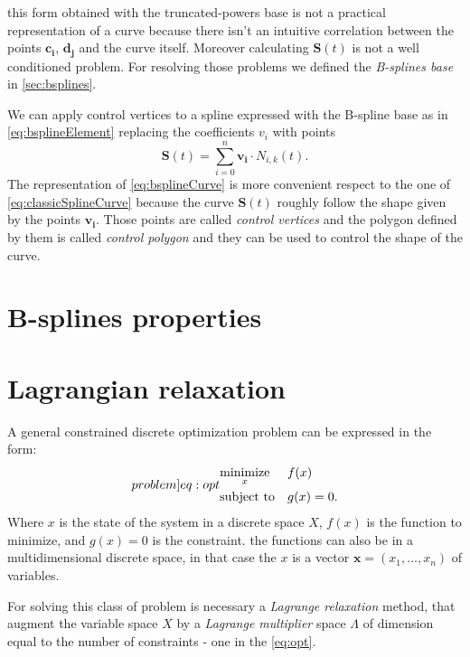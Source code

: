 \documentclass[dissertation.tex]{subfiles}
\begin{document}
this form obtained with the truncated-powers base is not a practical
representation of a curve because
there isn't an intuitive correlation between the points
$\mathbf{c_i}$, $\mathbf{d_j}$ and the curve itself. Moreover
calculating $\mathbf{S}(t)$ is not a well conditioned problem.
 For resolving those problems we
defined the \emph{B-splines base} in \cref{sec:bsplines}.

We can apply control vertices to a spline expressed with the B-spline
base as in \cref{eq:bsplineElement} replacing the coefficients $v_i$
with points
\begin{equation}\label{eq:bsplineCurve}
  \mathbf{S}(t)=\sum_{i=0}^n\mathbf{v_i}\cdot N_{i,k}(t).
\end{equation}
The representation of \cref{eq:bsplineCurve} is more convenient
respect to the one of 
\cref{eq:classicSplineCurve} because the curve $\mathbf{S}(t)$ roughly
follow the shape given by the points $\mathbf{v_i}$. Those points are
called \emph{control vertices} and the polygon defined by them is
called \emph{control polygon} and they can be used to control the
shape of the curve.

\section{B-splines properties}\label{sec:bsplineProp}

\section{Lagrangian relaxation}\label{sec:lagrangianRelaxation}
A general constrained discrete optimization problem can be expressed in
the form:
\begin{equation}\label[problem]{eq:opt}
\begin{aligned}
& \underset{x}{\text{minimize}}
& & f(x) \\
& \text{subject to}
& & g(x)=0.
\end{aligned}
\end{equation}
Where $x$ is the state of the system in a discrete space $X$, $f(x)$
is the function to
minimize, and $g(x)=0$ is the constraint. the functions can also be
in a multidimensional discrete space, in that case the $x$ is a vector
$\mathbf{x}=(x_1,\dots,x_n)$ of variables.

For solving this class
of problem is necessary a \emph{Lagrange relaxation} method, that
augment the variable space $X$ by a \emph{Lagrange multiplier} space
$\Lambda$ of dimension equal to the number of constraints - one in the
\cref{eq:opt}.
\end{document}
